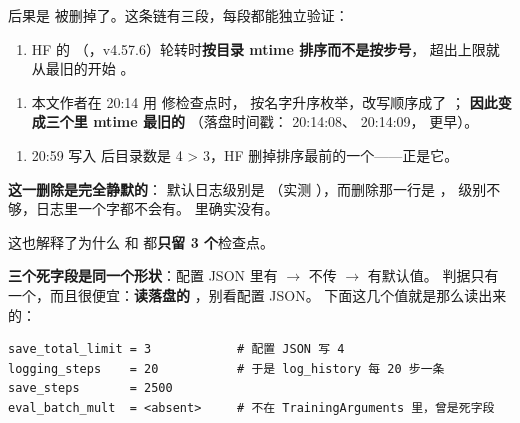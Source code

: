\documentclass[11pt,openany]{ctexart}
\begin{document}
后果是  被删掉了。这条链有三段，每段都能独立验证：

\begin{enumerate}
  \item HF 的  （，v4.57.6）轮转时\textbf{按目录 mtime 排序而不是按步号}， 超出上限就从最旧的开始 。
\end{enumerate}
\begin{enumerate}
  \item 本文作者在 20:14 用  修检查点时，  按名字升序枚举，改写顺序成了 ； \textbf{ 因此变成三个里 mtime 最旧的} （落盘时间戳： 20:14:08、 20:14:09， 更早）。
\end{enumerate}
\begin{enumerate}
  \item 20:59 写入  后目录数是 4 > 3，HF 删掉排序最前的一个——正是它。
\end{enumerate}

\textbf{这一删除是完全静默的}： 默认日志级别是  （实测 ），而删除那一行是 ， 级别不够，日志里一个字都不会有。 里确实没有。

这也解释了为什么  和  都\textbf{只留 3 个}检查点。

\textbf{三个死字段是同一个形状}：配置 JSON 里有 $\rightarrow$  不传 $\rightarrow$  有默认值。 判据只有一个，而且很便宜：\textbf{读落盘的 }，别看配置 JSON。 下面这几个值就是那么读出来的：

\begin{lstlisting}[]
save_total_limit = 3            # 配置 JSON 写 4
logging_steps    = 20           # 于是 log_history 每 20 步一条
save_steps       = 2500
eval_batch_mult  = <absent>     # 不在 TrainingArguments 里，曾是死字段
\end{lstlisting}
\end{document}
